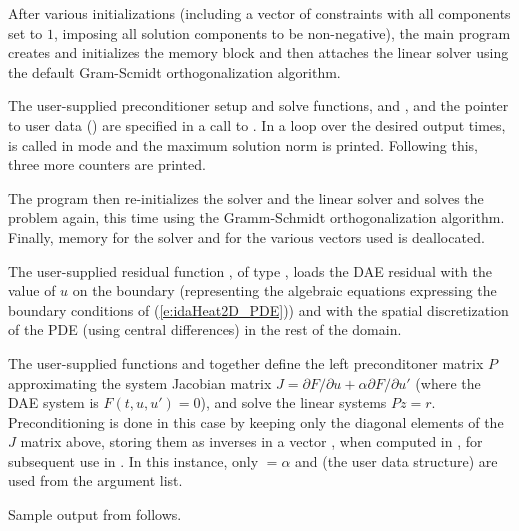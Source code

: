 After various initializations (including a vector of constraints with
all components set to $1$, imposing all solution components to be
non-negative), the main program creates and initializes the {\ida}
memory block and then attaches the {\idaspgmr} linear solver using the
default  Gram-Scmidt orthogonalization algorithm.

The user-supplied preconditioner setup and solve functions, 
and , and the pointer to user data () are specified
in a call to .
In a loop over the desired output times,  is called in 
mode and the maximum solution norm is printed.
Following this, three more counters are printed.

The  program then re-initializes the {\ida} solver and the
{\idaspgmr} linear solver and solves the problem again, this time
using the  Gramm-Schmidt orthogonalization algorithm.
Finally, memory for the {\ida} solver and for the various vectors used is deallocated.

The user-supplied residual function , of type ,
loads the DAE residual with the value of $u$ on the boundary
(representing the algebraic equations expressing the boundary
conditions of (\ref{e:idaHeat2D_PDE})) and with the spatial discretization 
of the PDE (using central differences) in the rest of the domain.

The user-supplied functions  and  together define the 
left preconditoner matrix $P$ approximating the system Jacobian matrix
$J = \partial F/ \partial u + \alpha \partial F/ \partial u'$ (where the DAE
system is $F(t,u,u') = 0$), and solve the linear systems $P z = r$.   
Preconditioning  is done in this case by keeping only the diagonal elements of 
the $J$ matrix above, storing them as inverses in a vector , when computed
in , for subsequent use in .
In this instance, only  $=\alpha$ and  (the user data
structure) are used from the  argument list.

Sample output from  follows.
